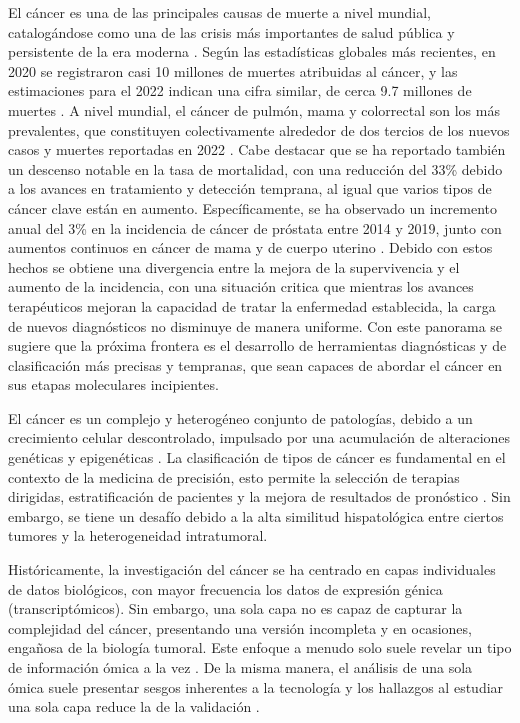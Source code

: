 \documentclass[review,12pt,times,number]{elsarticle}
\begin{document}
El cáncer es una de las principales causas de muerte a nivel mundial, catalogándose como una de las crisis más importantes de salud pública y persistente de la era moderna \cite{OMS_Cancer_2023_online}. Según las estadísticas globales más recientes, en 2020 se registraron casi 10 millones de muertes atribuidas al cáncer, y las estimaciones para el 2022 indican una cifra similar, de cerca 9.7 millones de muertes \cite{NCI_CancerStats_2025_online}. A nivel mundial, el cáncer de pulmón, mama y colorrectal son los más prevalentes, que constituyen colectivamente alrededor de dos tercios de los nuevos casos y muertes reportadas en 2022 \cite{siegel2023cancer}. Cabe destacar que se ha reportado también un descenso notable en la tasa de mortalidad, con una reducción del 33\% debido a los avances en tratamiento y detección temprana, al igual que varios tipos de cáncer clave están en aumento. Específicamente, se ha observado un incremento anual del 3\% en la incidencia de cáncer de próstata entre 2014 y 2019, junto con aumentos continuos en cáncer de mama y de cuerpo uterino \cite{dizon2024cancer}. Debido con estos hechos se obtiene una divergencia entre la mejora de la supervivencia y el aumento de la incidencia, con una situación critica que mientras los avances terapéuticos mejoran la capacidad de tratar la enfermedad establecida, la carga de nuevos diagnósticos no disminuye de manera uniforme. Con este panorama se sugiere que la próxima frontera es el desarrollo de herramientas diagnósticas y de clasificación más precisas y tempranas, que sean capaces de abordar el cáncer en sus etapas moleculares incipientes.

El cáncer es un complejo y heterogéneo conjunto de patologías, debido a un crecimiento celular descontrolado, impulsado por una acumulación de alteraciones genéticas y epigenéticas \cite{hanahan2011hallmarks}. La clasificación de tipos de cáncer es fundamental en el contexto de la medicina de precisión, esto permite la selección de terapias dirigidas, estratificación de pacientes y la mejora de resultados de pronóstico \cite{zhuang2021multi}. Sin embargo, se tiene un desafío debido a la alta similitud hispatológica entre ciertos tumores y la heterogeneidad intratumoral.

Históricamente, la investigación del cáncer se ha centrado en capas individuales de datos biológicos, con mayor frecuencia los datos de expresión génica (transcriptómicos). Sin embargo, una sola capa no es capaz de capturar la complejidad del cáncer, presentando una versión incompleta y en ocasiones, engañosa de la biología tumoral. Este enfoque a menudo solo suele revelar un tipo de información ómica a la vez \cite{acharya2024comprehensive}.  De la misma manera, el análisis de una sola ómica suele presentar sesgos inherentes a la tecnología y los hallazgos al estudiar una sola capa reduce la  de la validación \cite{massimino2023single}.
\end{document}
